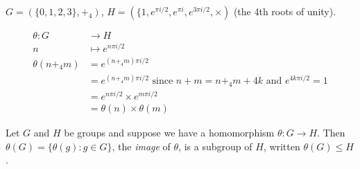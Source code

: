 \begin{example}
\protect\hypertarget{exm:isomorphism}{}\label{exm:isomorphism}\(G = (\{ 0, 1, 2, 3 \}, +_4)\), \(H = (\{1, e^{\pi i/2}, e^{\pi i}, e^{3\pi i/2}, \times)\) (the 4th roots of unity).

\begin{align*}
    \theta: G &\to H \\
    n &\mapsto e^{n \pi i /2} \\
    \theta(n +_4 m) &= e^{(n +_4 m) \pi i /2} \\
    &= e^{(n +_4 m) \pi i /2} \text{ since $n + m = n +_4 m + 4k$ and $e^{4k \pi i /2} = 1$} \\
    &= e^{n \pi i /2} \times e^{m \pi i /2} \\
    &= \theta(n) \times \theta(m)
\end{align*}
\end{example}

\begin{lemma}
Let \(G\) and \(H\) be groups and suppose we have a homomorphism \(\theta : G \to H\). Then \(\theta(G) = \{ \theta(g) : g \in G\}\), the \emph{image} of \(\theta\), is a subgroup of \(H\), written \(\theta(G) \leq H\).
\end{lemma}

